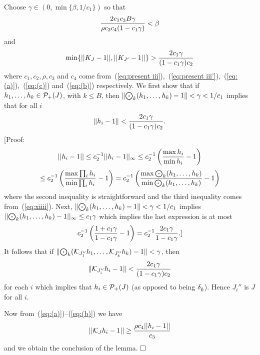   Choose $\gamma\in (0,\min\{\beta,1/c_1\})$ so that
$$
{2c_1 c_3 B\gamma  \over\rho c_2 c_4 (1-c_1\gamma)} < \beta
$$
and 
$$
\min\{||K_J-1||,||K_{J'}-1||\} > {2c_1 \gamma  \over (1-c_1\gamma)c_2}
$$
where $c_1,c_2,\rho,c_3$ and $c_4$ come 
from~(\ref{eq:present iii}),~(\ref{eq:present iii'}),~(\ref{eq:(a)}),~(\ref{eq:(c)}) and~(\ref{eq:(b)}) respectively.
We first show that if $h_1,\ldots,h_k\in{\cal P}_+(J)$, with $k\le B$, then
$\| {\bigodot}_k (h_1 , \ldots , h_k) - 1 \| <\gamma< 1/c_1$ implies that for all 
$i$
$$
\| h_i  - 1 \| <{2c_1\gamma \over (1-c_1\gamma)c_2}.
$$
[Proof:
$$
||h_i-1||\le c_2^{-1}||h_i-1||_\infty
\le c_2^{-1}\left({\max h_i\over \min h_i}-1\right)
$$
$$
\le c_2^{-1}\left({\max \prod_i h_i\over \min \prod_i h_i}-1\right)
=  c_2^{-1}\left({\max {\bigodot}_k (h_1 , \ldots , h_k)\over\min {\bigodot}_k 
(h_1 , \ldots , h_k) }-1\right)
$$
where the second inequality is straightforward and the
third inequality comes from~(\ref{eq:xiiii}).
Next, $\| {\bigodot}_k (h_1 , \ldots , h_k) - 1 \| <\gamma< 1/c_1$ implies 
$|| {\bigodot}_k (h_1 , \ldots , h_k) - 1 ||_\infty\le c_1\gamma$  
which implies the last expression is at most 
$$
c_2^{-1}\left({1+c_1\gamma\over 1-c_1\gamma}-1\right)=
c_2^{-1}{2c_1\gamma\over 1-c_1\gamma}.]
$$
It follows that if
$\| {\bigodot}_k ( {\cal K}_{J_1''} h_1 , \ldots , {\cal K}_{J_k''} h_k) - 1 \| <\gamma$,
then 
$$
\| {\cal K}_{J_i''} h_i-1 \| <{2c_1 \gamma \over (1-c_1\gamma)c_2}
$$ 
for each $i$ which implies that $h_i\in{\cal P}_+(J)$ 
(as opposed to being $\delta_{{\hat{0}}}$). Hence $J_i''$ is $J$ for all $i$.

Now from~(\ref{eq:(a)})--(\ref{eq:(b)}) we have 
$$||{\cal K}_{J} h_i - 1|| \geq {\rho c_4 ||h_i - 1|| \over c_3}$$
and we obtain the conclusion of the lemma.
$\qed$

